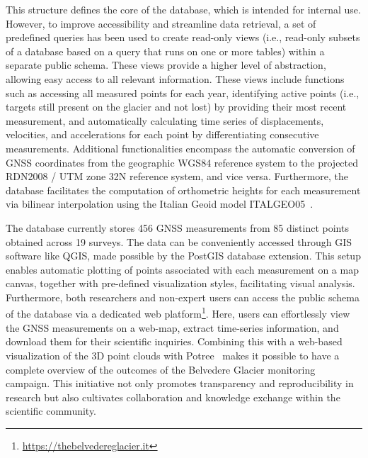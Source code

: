 This structure defines the core of the database, which is intended for internal use. 
However, to improve accessibility and streamline data retrieval, a set of predefined queries has been used to create read-only views (i.e., read-only subsets of a database based on a query that runs on one or more tables) within a separate public schema. 
These views provide a higher level of abstraction, allowing easy access to all relevant information.
These views include functions such as accessing all measured points for each year, identifying active points (i.e., targets still present on the glacier and not lost) by providing their most recent measurement, and automatically calculating time series of displacements, velocities, and accelerations for each point by differentiating consecutive measurements.
Additional functionalities encompass the automatic conversion of GNSS coordinates from the geographic WGS84 reference system to the projected RDN2008 / UTM zone 32N reference system, and vice versa. Furthermore, the database facilitates the computation of orthometric heights for each measurement via bilinear interpolation using the Italian Geoid model ITALGEO05~\citep{Barzaghi2007}.

The database currently stores 456 GNSS measurements from 85 distinct points obtained across 19 surveys. 
The data can be conveniently accessed through GIS software like QGIS, made possible by the PostGIS database extension. 
This setup enables automatic plotting of points associated with each measurement on a map canvas, together with pre-defined visualization styles, facilitating visual analysis.
Furthermore, both researchers and non-expert users can access the public schema of the database via a dedicated web platform\footnote{\url{https://thebelvedereglacier.it}}. Here, users can effortlessly view the GNSS measurements on a web-map, extract time-series information, and download them for their scientific inquiries. 
Combining this with a web-based visualization of the 3D point clouds with Potree~\citep{schutz2016potree} makes it possible to have a complete overview of the outcomes of the Belvedere Glacier monitoring campaign.
This initiative not only promotes transparency and reproducibility in research but also cultivates collaboration and knowledge exchange within the scientific community.

